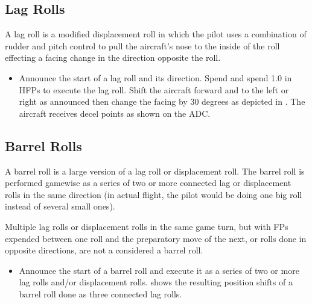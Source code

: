 \subsection{Lag Rolls}

A lag roll is a modified displacement roll in which the pilot uses a combination of rudder and pitch control to pull the aircraft's nose to the inside of the roll effecting a facing change in the direction opposite the roll.

\begin{itemize}
    \item{} Announce the start of a lag roll and its direction. Spend  and spend 1.0 in HFPs to execute the lag roll. Shift the aircraft forward and to the left or right as announced then change the facing by 30 degrees as depicted in  . The aircraft receives decel points as shown on the ADC.
\end{itemize}

\subsection{Barrel Rolls}


A barrel roll is a large version of a lag roll or displacement roll. The barrel roll is performed gamewise as a series of two or more connected lag or displacement rolls in the same direction (in actual flight, the pilot would be doing one big roll instead of several small ones).

Multiple lag rolls or displacement rolls in the same game turn, but with FPs expended between one roll and the preparatory move of the next, or rolls done in opposite directions, are not a considered a barrel roll.

\begin{itemize}
    \item{} Announce the start of a barrel roll and execute it as a series of two or more lag rolls and/or displacement rolls.  shows the resulting position shifts of a barrel roll done as three connected lag rolls.
\end{itemize}

